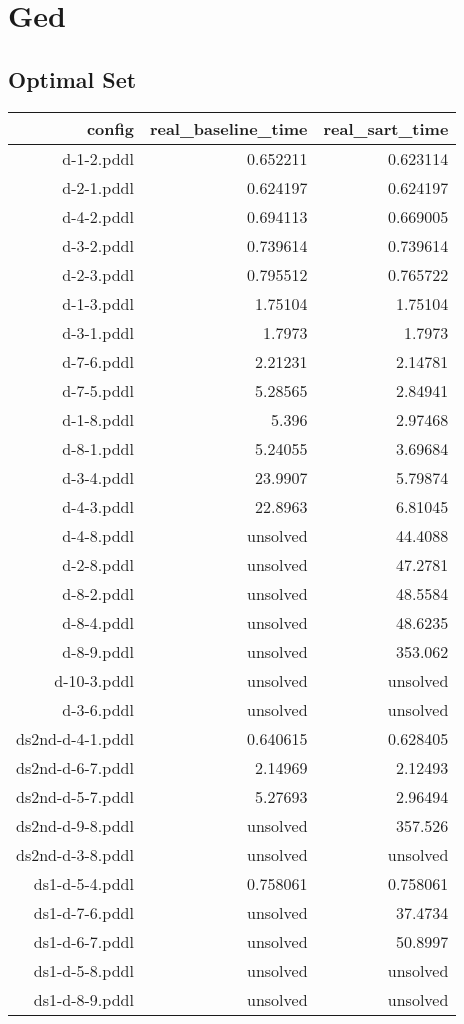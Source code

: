 \documentclass{article}
\begin{document}
                \newpage \section{Ged}
                    \subsection*{Optimal Set}
                    
                            \begin{center}
                            \scriptsize
                            \begin{tabular}{r|r|r}
                            config & real\_baseline\_time & real\_sart\_time\\\midrule
                             d-1-2.pddl&0.652211&0.623114\\
 d-2-1.pddl&0.624197&0.624197\\
 d-4-2.pddl&0.694113&0.669005\\
 d-3-2.pddl&0.739614&0.739614\\
 d-2-3.pddl&0.795512&0.765722\\
 d-1-3.pddl&1.75104&1.75104\\
 d-3-1.pddl&1.7973&1.7973\\
 d-7-6.pddl&2.21231&2.14781\\
 d-7-5.pddl&5.28565&2.84941\\
 d-1-8.pddl&5.396&2.97468\\
 d-8-1.pddl&5.24055&3.69684\\
 d-3-4.pddl&23.9907&5.79874\\
 d-4-3.pddl&22.8963&6.81045\\
 d-4-8.pddl&unsolved&44.4088\\
 d-2-8.pddl&unsolved&47.2781\\
 d-8-2.pddl&unsolved&48.5584\\
 d-8-4.pddl&unsolved&48.6235\\
 d-8-9.pddl&unsolved&353.062\\
 d-10-3.pddl&unsolved&unsolved\\
 d-3-6.pddl&unsolved&unsolved\\
 ds2nd-d-4-1.pddl&0.640615&0.628405\\
 ds2nd-d-6-7.pddl&2.14969&2.12493\\
 ds2nd-d-5-7.pddl&5.27693&2.96494\\
 ds2nd-d-9-8.pddl&unsolved&357.526\\
 ds2nd-d-3-8.pddl&unsolved&unsolved\\
 ds1-d-5-4.pddl&0.758061&0.758061\\
 ds1-d-7-6.pddl&unsolved&37.4734\\
 ds1-d-6-7.pddl&unsolved&50.8997\\
 ds1-d-5-8.pddl&unsolved&unsolved\\
 ds1-d-8-9.pddl&unsolved&unsolved
                            \end{tabular}
                            \end{center}
                    
\end{document}
